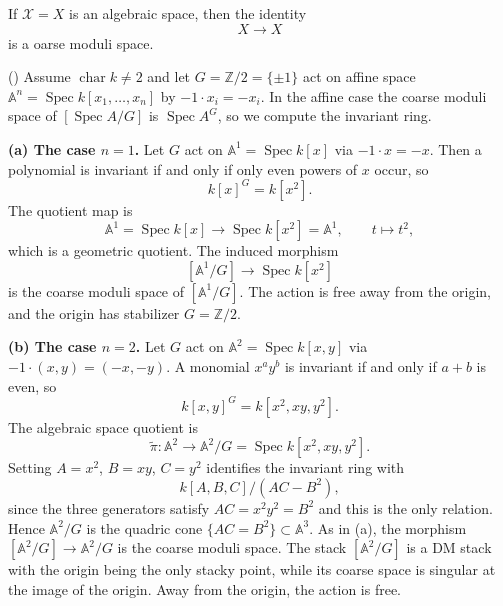 \begin{example}
	If $\mathcal{X} = X$ is an algebraic space, then the identity
	\[
	X \to X
	\]
	is a oarse moduli space.
\end{example}


\begin{example}\label{ex:Z2-coarse}
		(\cite[][Example 5.2.4.]{alper2026stacks})
		Assume $\operatorname{char}k\neq2$ and let $G=\mathbb{Z}/2=\{\pm1\}$ act on affine space $\mathbb{A}^n=\operatorname{Spec}k[x_1,\dots,x_n]$ by $-1\cdot x_i=-x_i$. In the affine case the coarse moduli space of $[\operatorname{Spec}A/G]$ is $\operatorname{Spec}A^G$, so we compute the invariant ring.
		
		\medskip\noindent\textbf{(a) The case $n=1$.}
		Let $G$ act on $\mathbb{A}^1=\operatorname{Spec}k[x]$ via $-1\cdot x=-x$. Then a polynomial is invariant if and only if only even powers of $x$ occur, so
		\[
		k[x]^G=k[x^2].
		\]
		The quotient map is
		\[
		\mathbb{A}^1=\operatorname{Spec}k[x]\longrightarrow\operatorname{Spec}k[x^2]=\mathbb{A}^1,\qquad t\mapsto t^2,
		\]
		which is a geometric quotient. The induced morphism
		\[
		[\mathbb{A}^1/G]\longrightarrow\operatorname{Spec}k[x^2]
		\]
		is the coarse moduli space of $[\mathbb{A}^1/G]$. The action is free away from the origin, and the origin has stabilizer $G=\mathbb{Z}/2$.
		
		\medskip\noindent\textbf{(b) The case $n=2$.}
		Let $G$ act on $\mathbb{A}^2=\operatorname{Spec}k[x,y]$ via $-1\cdot(x,y)=(-x,-y)$. A monomial $x^ay^b$ is invariant if and only if $a+b$ is even, so
		\[
		k[x,y]^G=k[x^2,xy,y^2].
		\]
		The algebraic space quotient is
		\[
		\tilde{\pi}: \mathbb{A}^2\longrightarrow\mathbb{A}^2/G=\operatorname{Spec}k[x^2,xy,y^2].
		\]
		Setting $A=x^2$, $B=xy$, $C=y^2$ identifies the invariant ring with
		\[
		k[A,B,C]/(AC-B^2),
		\]
		since the three generators satisfy $AC=x^2y^2=B^2$ and this is the only relation. Hence $\mathbb{A}^2/G$ is the quadric cone $\{AC=B^2\}\subset\mathbb{A}^3$. As in (a), the morphism $[\mathbb{A}^2/G]\to\mathbb{A}^2/G$ is the coarse moduli space. The stack $[\mathbb{A}^2/G]$ is a DM stack with the origin being the only stacky point, while its coarse space is singular at the image of the origin. Away from the origin, the action is free.
	\end{example}

